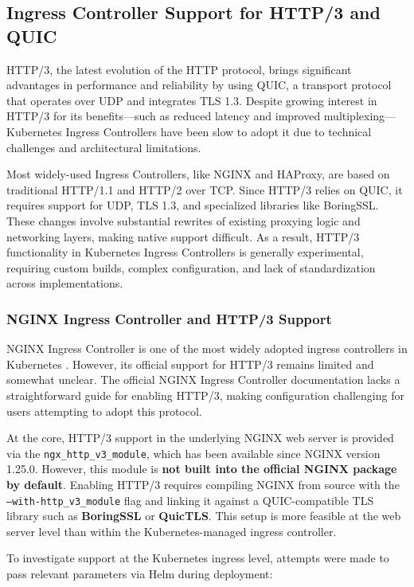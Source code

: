 \subsection{Ingress Controller Support for HTTP/3 and QUIC}
HTTP/3, the latest evolution of the HTTP protocol, brings significant advantages in performance and reliability by using QUIC, a transport protocol that operates over UDP and integrates TLS 1.3. Despite growing interest in HTTP/3 for its benefits—such as reduced latency and improved multiplexing—Kubernetes Ingress Controllers have been slow to adopt it due to technical challenges and architectural limitations.

Most widely-used Ingress Controllers, like NGINX and HAProxy, are based on traditional HTTP/1.1 and HTTP/2 over TCP. Since HTTP/3 relies on QUIC, it requires support for UDP, TLS 1.3, and specialized libraries like BoringSSL. These changes involve substantial rewrites of existing proxying logic and networking layers, making native support difficult. As a result, HTTP/3 functionality in Kubernetes Ingress Controllers is generally experimental, requiring custom builds, complex configuration, and lack of standardization across implementations.


\subsubsection{NGINX Ingress Controller and HTTP/3 Support}

NGINX Ingress Controller is one of the most widely adopted ingress controllers in Kubernetes \cite{nginx-ingress-docs}. However, its official support for HTTP/3 remains limited and somewhat unclear. The official NGINX Ingress Controller documentation lacks a straightforward guide for enabling HTTP/3, making configuration challenging for users attempting to adopt this protocol.

At the core, HTTP/3 support in the underlying NGINX web server is provided via the \texttt{ngx\_http\_v3\_module}, which has been available since NGINX version 1.25.0. However, this module is \textbf{not built into the official NGINX package by default}. Enabling HTTP/3 requires compiling NGINX from source with the \texttt{--with-http\_v3\_module} flag and linking it against a QUIC-compatible TLS library such as \textbf{BoringSSL} or \textbf{QuicTLS}. This setup is more feasible at the web server level than within the Kubernetes-managed ingress controller.

To investigate support at the Kubernetes ingress level, attempts were made to pass relevant parameters via Helm during deployment:

